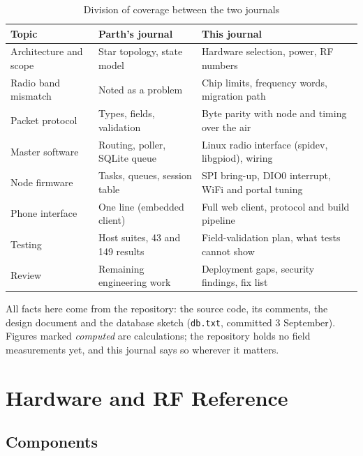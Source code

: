 \documentclass{tietreport}
\begin{document}
\begin{table}[h]
\centering
\small
\begin{tabular}{|p{1.7in}|p{1.9in}|p{1.9in}|}
  \hline
  \textbf{Topic} & \textbf{Parth's journal} & \textbf{This journal} \\
  \hline
  Architecture and scope & Star topology, state model &
  Hardware selection, power, RF numbers \\
  \hline
  Radio band mismatch & Noted as a problem &
  Chip limits, frequency words, migration path \\
  \hline
  Packet protocol & Types, fields, validation &
  Byte parity with node and timing over the air \\
  \hline
  Master software & Routing, poller, SQLite queue &
  Linux radio interface (spidev, libgpiod), wiring \\
  \hline
  Node firmware & Tasks, queues, session table &
  SPI bring-up, DIO0 interrupt, WiFi and portal tuning \\
  \hline
  Phone interface & One line (embedded client) &
  Full web client, protocol and build pipeline \\
  \hline
  Testing & Host suites, 43 and 149 results &
  Field-validation plan, what tests cannot show \\
  \hline
  Review & Remaining engineering work &
  Deployment gaps, security findings, fix list \\
  \hline
\end{tabular}
\caption{Division of coverage between the two journals}
\label{tab:split}
\end{table}

All facts here come from the repository: the source code, its
comments, the design document and the database sketch
(\texttt{db.txt}, committed 3 September). Figures marked
\emph{computed} are calculations; the repository holds no field
measurements yet, and this journal says so wherever it matters.

\chapter{Hardware and RF Reference}

\section{Components}
\end{document}

